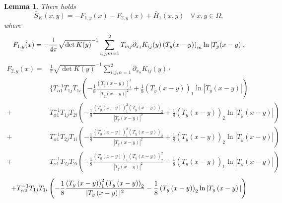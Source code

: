 \documentclass[12pt,reqno]{amsart}
\numberwithin{equation}{section}
\newtheorem{lemma}[theorem]{Lemma}
\theoremstyle{definition}
\theoremstyle{remark}
\begin{document}
\begin{lemma}\label{Green expansion2}
There holds
\begin{equation*}
\bar{S}_K(x,y)=-F_{1,y}(x)-F_{2,y}(x)+\bar{H}_1(x,y) \ \ \ \ \forall\ x,y\in\Omega,
\end{equation*}
where
\begin{equation}\label{exp of F_{1,y}}
\begin{split}
F_{1,y}(x)=-\frac{1}{4\pi}\sqrt{\det K(y)}^{-1}\sum_{i,j,m=1}^2T_{mj}\partial_{x_i}K_{ij}(y)\left( T_y(x-y)\right)_m\ln|T_y(x-y)|,
\end{split}
\end{equation}
\begin{equation*}
\begin{split}
F_{2,y}(x)=&\frac{1}{\pi}\sqrt{\det K(y)}^{-1}\sum_{i,j,\alpha=1}^2\partial_{x_\alpha}K_{ij}(y)\cdot\\
&\bigg\{T^{-1}_{\alpha1}T_{1j}T_{1i}\left( -\frac{1}{8}\frac{\left( T_y\left (x-y\right )\right) _1^3}{|T_y\left (x-y\right )|^2}+\frac{1}{8}\left( T_y\left (x-y\right )\right)_1\ln|T_y\left (x-y\right )|\right) \\
+&T^{-1}_{\alpha1}T_{1j}T_{2i}\left( -\frac{1}{8}\frac{\left( T_y\left (x-y\right )\right) _1^2\left( T_y\left (x-y\right )\right) _2}{|T_y\left (x-y\right )|^2}+\frac{1}{8}\left( T_y\left (x-y\right )\right)_2\ln|T_y\left (x-y\right )|\right) \\
+&T^{-1}_{\alpha1}T_{2j}T_{1i}\left( -\frac{1}{8}\frac{\left( T_y\left (x-y\right )\right) _1^2\left( T_y\left (x-y\right )\right) _2}{|T_y\left (x-y\right )|^2}+\frac{1}{8}\left( T_y\left (x-y\right )\right)_2\ln|T_y\left (x-y\right )|\right)\\
+&T^{-1}_{\alpha1}T_{2j}T_{2i}\left( -\frac{1}{8}\frac{\left( T_y\left (x-y\right )\right) _1\left( T_y\left (x-y\right )\right) _2^2}{|T_y\left (x-y\right )|^2}-\frac{1}{8}\left( T_y\left (x-y\right )\right)_1\ln|T_y\left (x-y\right )|\right)
\end{split}
\end{equation*}
\begin{equation}\label{exp of F_{2,y}}
\begin{split}
+&T^{-1}_{\alpha2}T_{1j}T_{1i}\left( -\frac{1}{8}\frac{\left( T_y\left (x-y\right )\right) _1^2\left( T_y\left (x-y\right )\right) _2}{|T_y\left (x-y\right )|^2}-\frac{1}{8}\left( T_y\left (x-y\right )\right)_2\ln|T_y\left (x-y\right )|\right)\\

\end{split}
\end{equation}
\end{lemma}
\end{document}
